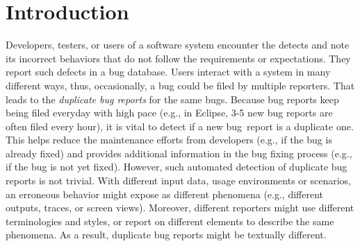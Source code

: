 \section{Introduction}
\label{intro}


Developers, testers, or users of a software system encounter the
detects and note its incorrect behaviors that do not follow the
requirements or expectations. They report such defects in
a bug database.
%
%
Users interact with a system in many different ways,
thus, occasionally, a bug could be filed by multiple reporters. That
leads to the {\em duplicate bug reports} for the same bugs. Because
bug reports keep being filed everyday with high pace (e.g., in
Eclipse, 3-5 new bug reports are often filed every hour), it is vital
to detect if a new bug~report is a duplicate one. This
helps reduce the maintenance efforts from developers (e.g., if the bug
is already fixed) and provides additional information in the bug
fixing process (e.g., if the bug is not yet fixed).
%
However, such automated detection of duplicate bug reports is not
trivial. With different input data, usage environments or scenarios,
an erroneous behavior might expose as different phenomena (e.g.,
different outputs, traces, or screen views). Moreover, different
reporters might use different terminologies and styles, or report on
different elements to describe the same phenomena. As a result,
duplicate bug reports might be textually different.




